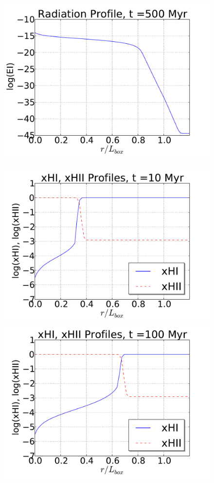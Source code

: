 \begin{figure}[t]
{  \includegraphics[scale=0.3, trim=1.0cm 1.0cm 1.0cm 0.5cm]{i1-Eprofiles_500Myr.pdf}
  \hfill}
\centerline{\hfill
  \includegraphics[scale=0.3, trim=1.0cm 0.5cm 1.0cm 0.5cm]{i1-profiles_10Myr.pdf}
  \includegraphics[scale=0.3, trim=1.0cm 0.5cm 1.0cm 0.5cm]{i1-profiles_100Myr.pdf}
}
\end{figure}
